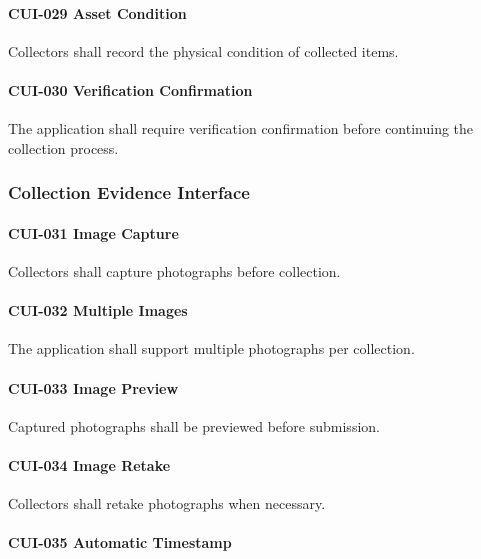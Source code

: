 \paragraph{CUI-029 Asset Condition}

Collectors shall record the physical condition of collected items.

\paragraph{CUI-030 Verification Confirmation}

The application shall require verification confirmation before
continuing the collection process.


\subsubsection*{Collection Evidence Interface}

\paragraph{CUI-031 Image Capture}

Collectors shall capture photographs before collection.

\paragraph{CUI-032 Multiple Images}

The application shall support multiple photographs per collection.

\paragraph{CUI-033 Image Preview}

Captured photographs shall be previewed before submission.

\paragraph{CUI-034 Image Retake}

Collectors shall retake photographs when necessary.

\paragraph{CUI-035 Automatic Timestamp}

